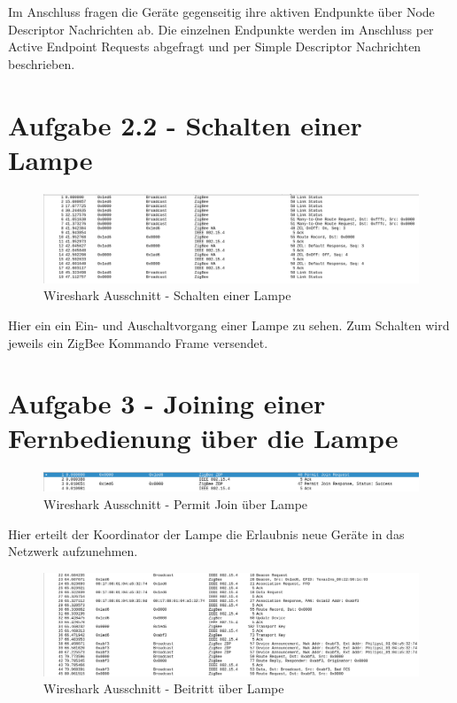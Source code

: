 Im Anschluss fragen die Geräte gegenseitig ihre aktiven Endpunkte über \grqq Node Descriptor\grqq{} Nachrichten ab. Die einzelnen Endpunkte werden im Anschluss per \grqq 
Active Endpoint Requests\grqq{} abgefragt und per \grqq Simple Descriptor\grqq{} Nachrichten beschrieben.

\section{Aufgabe 2.2 - Schalten einer Lampe}

\begin{figure}[H]
    \centering
    \includegraphics[width=1\textwidth]{media/lsg2.2.png}
    \caption{Wireshark Ausschnitt - Schalten einer Lampe}
\end{figure}

Hier ein ein Ein- und Auschaltvorgang einer Lampe zu sehen. Zum Schalten wird jeweils ein \grqq ZigBee Kommando Frame\grqq{} versendet.

\section{Aufgabe 3 - Joining einer Fernbedienung über die Lampe}

\begin{figure}[H]
    \centering
    \includegraphics[width=1\textwidth]{media/lsg-3-1.png}
    \caption{Wireshark Ausschnitt - Permit Join über Lampe}
\end{figure}

Hier erteilt der Koordinator der Lampe die Erlaubnis neue Geräte in das Netzwerk aufzunehmen.

\begin{figure}[H]
    \centering
    \includegraphics[width=1\textwidth]{media/lsg-3-2.png}
    \caption{Wireshark Ausschnitt - Beitritt über Lampe}
\end{figure}

